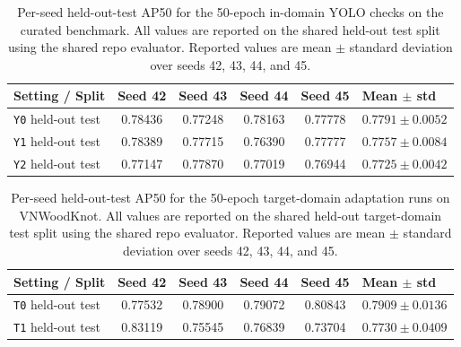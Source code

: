 \documentclass[cmc,article,submit,moreauthors,pdftex]{Definitions/tsp}
\begin{document}
\begin{table}[ht]
  \centering
  \caption{Per-seed held-out-test AP50 for the 50-epoch in-domain YOLO checks on the curated benchmark. All values are reported on the shared held-out test split using the shared repo evaluator. Reported values are mean $\pm$ standard deviation over seeds 42, 43, 44, and 45.}
  \label{tab:app-curated-perseed}
  \scriptsize
  \setlength{\tabcolsep}{4pt}
  \begin{tabularx}{\textwidth}{>{\raggedright\arraybackslash}p{} c c c c X}
    \toprule
    Setting / Split & Seed 42 & Seed 43 & Seed 44 & Seed 45 & Mean $\pm$ std \\
    \midrule
    \texttt{Y0} held-out test & 0.78436 & 0.77248 & 0.78163 & 0.77778 & $0.7791 \pm 0.0052$ \\
    \texttt{Y1} held-out test & 0.78389 & 0.77715 & 0.76390 & 0.77777 & $0.7757 \pm 0.0084$ \\
    \texttt{Y2} held-out test & 0.77147 & 0.77870 & 0.77019 & 0.76944 & $0.7725 \pm 0.0042$ \\
    \bottomrule
  \end{tabularx}
\end{table}

\begin{table}[ht]
  \centering
  \caption{Per-seed held-out-test AP50 for the 50-epoch target-domain adaptation runs on VNWoodKnot. All values are reported on the shared held-out target-domain test split using the shared repo evaluator. Reported values are mean $\pm$ standard deviation over seeds 42, 43, 44, and 45.}
  \label{tab:app-transfer-perseed}
  \scriptsize
  \setlength{\tabcolsep}{4pt}
  \begin{tabularx}{\textwidth}{>{\raggedright\arraybackslash}p{} c c c c X}
    \toprule
    Setting / Split & Seed 42 & Seed 43 & Seed 44 & Seed 45 & Mean $\pm$ std \\
    \midrule
    \texttt{T0} held-out test & 0.77532 & 0.78900 & 0.79072 & 0.80843 & $0.7909 \pm 0.0136$ \\
    \texttt{T1} held-out test & 0.83119 & 0.75545 & 0.76839 & 0.73704 & $0.7730 \pm 0.0409$ \\
    \bottomrule
  \end{tabularx}
\end{table}
\end{document}
